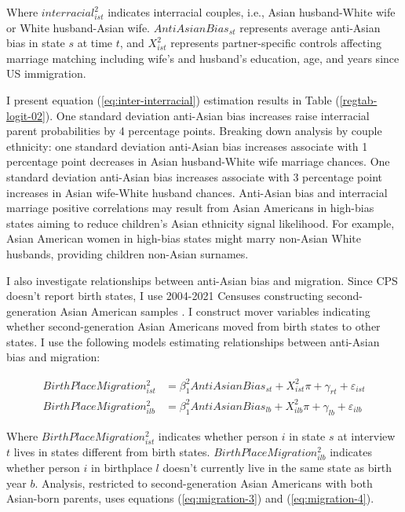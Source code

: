 Where $interracial_{ist}^2$ indicates interracial couples, i.e., Asian husband-White wife or White husband-Asian wife. $AntiAsianBias_{st}$ represents average anti-Asian bias in state $s$ at time $t$, and $X_{ist}^2$ represents partner-specific controls affecting marriage matching including wife's and husband's education, age, and years since US immigration.

I present equation (\ref{eq:inter-interracial}) estimation results in Table (\ref{regtab-logit-02}). One standard deviation anti-Asian bias increases raise interracial parent probabilities by 4 percentage points. Breaking down analysis by couple ethnicity: one standard deviation anti-Asian bias increases associate with 1 percentage point decreases in Asian husband-White wife marriage chances. One standard deviation anti-Asian bias increases associate with 3 percentage point increases in Asian wife-White husband chances. Anti-Asian bias and interracial marriage positive correlations may result from Asian Americans in high-bias states aiming to reduce children's Asian ethnicity signal likelihood. For example, Asian American women in high-bias states might marry non-Asian White husbands, providing children non-Asian surnames.

I also investigate relationships between anti-Asian bias and migration. Since CPS doesn't report birth states, I use 2004-2021 Censuses constructing second-generation Asian American samples \autocite{floodsarahIntegratedPublicUse2021}. I construct mover variables indicating whether second-generation Asian Americans moved from birth states to other states. I use the following models estimating relationships between anti-Asian bias and migration:

\begin{align}
BirthPlaceMigration_{ist}^2 &= \beta_1^2 AntiAsianBias_{st} 
                   + X_{ist}^2\pi + \gamma_{rt} 
                   + \varepsilon_{ist} \label{eq:migration-3} \\
BirthPlaceMigration_{ilb}^2 &= \beta_1^2 AntiAsianBias_{lb} 
                   + X_{ilb}^2\pi + \gamma_{lb} 
                   + \varepsilon_{ilb} \label{eq:migration-4}
\end{align}

Where $BirthPlaceMigration_{ist}^2$ indicates whether person $i$ in state $s$ at interview $t$ lives in states different from birth states. $BirthPlaceMigration_{ilb}^2$ indicates whether person $i$ in birthplace $l$ doesn't currently live in the same state as birth year $b$. Analysis, restricted to second-generation Asian Americans with both Asian-born parents, uses equations (\ref{eq:migration-3}) and (\ref{eq:migration-4}).

